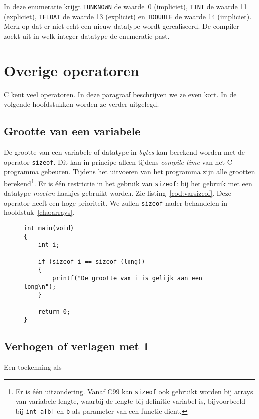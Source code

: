 In deze enumeratie krijgt \texttt{TUNKNOWN} de waarde~0 (impliciet), \texttt{TINT} de waarde 11 (expliciet), \texttt{TFLOAT} de waarde 13 (expliciet) en \texttt{TDOUBLE} de waarde 14 (impliciet). Merk op dat er niet echt een nieuw datatype wordt gerealiseerd. De compiler zoekt uit in welk integer datatype de enumeratie past.


\section{Overige operatoren}
C kent veel operatoren. In deze paragraaf beschrijven we ze even kort. In de volgende hoofdstukken worden ze verder uitgelegd.

\subsection{Grootte van een variabele}
De grootte van een variabele of datatype in \textsl{bytes} kan berekend worden met de operator \mbox{\texttt{sizeof}}. Dit kan in principe alleen tijdens \textsl{compile-time} van het C-programma gebeuren. Tijdens het uitvoeren van het programma zijn alle grootten berekend\footnote{Er is één uitzondering. Vanaf C99 kan \texttt{sizeof} ook gebruikt worden bij arrays van variabele lengte, waarbij de lengte bij definitie variabel is, bijvoorbeeld bij \texttt{int a[b]} en \texttt{b} als parameter van een functie dient.}. Er is één restrictie in het gebruik van \texttt{sizeof}: bij het gebruik met een datatype \textsl{moeten} haakjes gebruikt worden. Zie listing~\ref{cod:varsizeof}. Deze operator heeft een hoge prioriteit. We zullen \texttt{sizeof} nader behandelen in hoofdstuk~\ref{cha:arrays}.

\begin{figure}[!ht]
\begin{lstlisting}[caption=Gebruik van \texttt{sizeof}.,label=cod:varsizeof]
int main(void)
{
	int i;

    if (sizeof i == sizeof (long))
    {
        printf("De grootte van i is gelijk aan een long\n");
    }

    return 0;
}
\end{lstlisting}
\end{figure}

\subsection{Verhogen of verlagen met 1}
Een toekenning als

